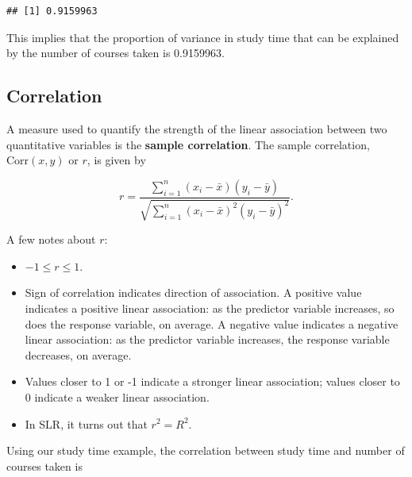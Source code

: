 \documentclass[
]{book}
\newenvironment{Shaded}{\begin{snugshade}}{\end{snugshade}}
\newcommand{\FunctionTok}[1]{\textcolor[rgb]{0.13,0.29,0.53}{\textbf{#1}}}
\newcommand{\NormalTok}[1]{#1}
\newcommand{\SpecialCharTok}[1]{\textcolor[rgb]{0.81,0.36,0.00}{\textbf{#1}}}
\providecommand{\tightlist}{%
  \setlength{\itemsep}{0pt}\setlength{\parskip}{0pt}}
\begin{document}
\begin{verbatim}
## [1] 0.9159963
\end{verbatim}

This implies that the proportion of variance in study time that can be explained by the number of courses taken is 0.9159963.

\hypertarget{correlation}{%
\subsection{Correlation}\label{correlation}}

A measure used to quantify the strength of the linear association between two quantitative variables is the \textbf{sample correlation}. The sample correlation, \(\mbox{Corr}(x,y)\) or \(r\), is given by

\begin{equation} 
r = \frac{\sum\limits_{i=1}^{n}(x_i - \bar{x})(y_i - \bar{y})}{\sqrt{\sum\limits_{i=1}^{n}(x_i - \bar{x})^{2}(y_i - \bar{y})^{2}}}.
\label{eq:corr}
\end{equation}

A few notes about \(r\):

\begin{itemize}
\tightlist
\item
  \(-1 \leq r \leq 1\).
\item
  Sign of correlation indicates direction of association. A positive value indicates a positive linear association: as the predictor variable increases, so does the response variable, on average. A negative value indicates a negative linear association: as the predictor variable increases, the response variable decreases, on average.
\item
  Values closer to 1 or -1 indicate a stronger linear association; values closer to 0 indicate a weaker linear association.
\item
  In SLR, it turns out that \(r^2 = R^2\).
\end{itemize}

Using our study time example, the correlation between study time and number of courses taken is

\begin{Shaded}
\end{Shaded}
\end{document}
